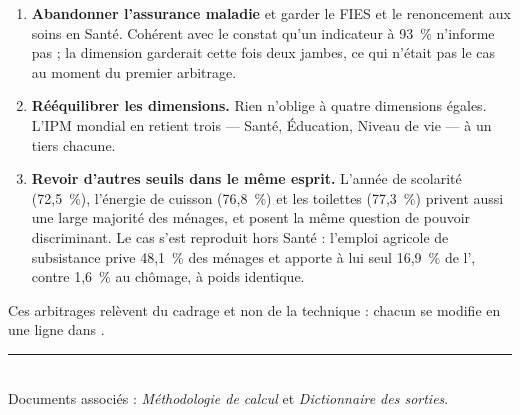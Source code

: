 \documentclass[11pt,a4paper]{article}
\begin{document}
\begin{enumerate}
  \item \textbf{Abandonner l'assurance maladie} et garder le FIES et le renoncement aux soins en
  Santé. Cohérent avec le constat qu'un indicateur à 93~\% n'informe pas ; la dimension garderait
  cette fois deux jambes, ce qui n'était pas le cas au moment du premier arbitrage.

  \item \textbf{Rééquilibrer les dimensions.} Rien n'oblige à quatre dimensions égales. L'IPM
  mondial en retient trois --- Santé, Éducation, Niveau de vie --- à un tiers chacune.

  \item \textbf{Revoir d'autres seuils dans le même esprit.} L'année de scolarité (72,5~\%),
  l'énergie de cuisson (76,8~\%) et les toilettes (77,3~\%) privent aussi une large majorité des
  ménages, et posent la même question de pouvoir discriminant. Le cas s'est reproduit hors Santé :
  l'emploi agricole de subsistance prive 48,1~\% des ménages et apporte à lui seul 16,9~\% de
  l'\ipm{}, contre 1,6~\% au chômage, à poids identique.
\end{enumerate}

Ces arbitrages relèvent du cadrage et non de la technique : chacun se modifie en une ligne dans
.

\vfill
\noindent\rule{\linewidth}{0.4pt}\\[2pt]
\small
Documents associés : \emph{Méthodologie de calcul} et \emph{Dictionnaire des sorties}.
\end{document}
